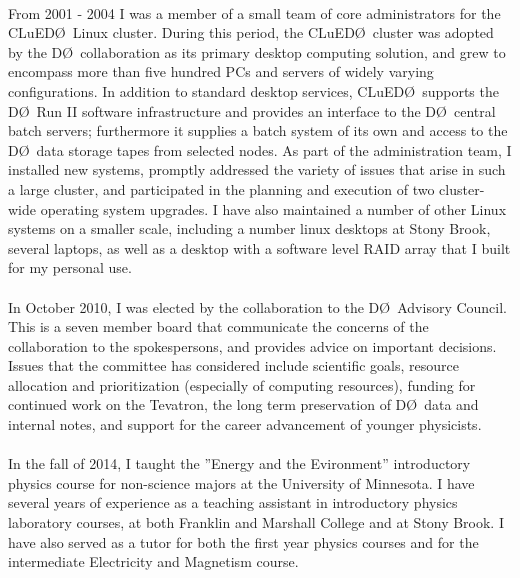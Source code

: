 \documentclass[amsmath,amssymb]{revtex4}
\def\dzero{D\O}
\def\cluedo{CLuED\O}
\begin{document}
\\
\indent From 2001 - 2004 I was a member of a small team of core
administrators for the \cluedo\ Linux cluster.  During this period,
the \cluedo~cluster was adopted by the \dzero~collaboration as its
primary desktop computing solution, and grew to encompass more than
five hundred PCs and servers of widely varying configurations.  In
addition to standard desktop services, \cluedo\ supports the \dzero\
Run II software infrastructure and provides an interface to the
\dzero\ central batch servers; furthermore it supplies a batch system
of its own and access to the \dzero\ data storage tapes from selected
nodes.  As part of the administration team, I installed new systems,
promptly addressed the variety of issues that arise in such a large
cluster, and participated in the planning and execution of two
cluster-wide operating system upgrades.  I have also maintained a
number of other Linux systems on a smaller scale, including a number
linux desktops at Stony Brook, several laptops, as well as a desktop
with a software level RAID array that I built for my personal use.\\

%

\noindent{\bf \dzero~Advisory Council}\\
\indent In October 2010, I was elected by the collaboration to the
\dzero\ Advisory Council.  This is a seven member board that
communicate the concerns of the collaboration to the spokespersons,
and provides advice on important decisions. Issues that the committee
has considered include scientific goals, resource allocation and
prioritization (especially of computing resources), funding for
continued work on the Tevatron, the long term preservation of
\dzero~data and internal notes, and support for
the career advancement of younger physicists.\\

\\
\indent In the fall of 2014, I taught the ''Energy and the
Evironment'' introductory physics course for non-science majors at the
University of Minnesota.  I have several years of experience as a
teaching assistant in introductory physics laboratory courses, at both
Franklin and Marshall College and at Stony Brook. I have also served
as a tutor for both the first year physics courses and for the
intermediate Electricity and Magnetism course.
\end{document}
